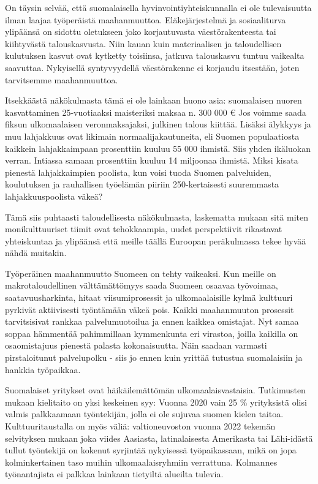 \documentclass[nobib,finnish,oneside,openany,notoc,a4paper]{tufte-book}
\begin{document}
On täysin selvää, että suomalaisella hyvinvointiyhteiskunnalla ei ole
tulevaisuutta ilman laajaa työperäistä maahanmuuttoa. Eläkejärjestelmä
ja sosiaaliturva ylipäänsä on sidottu oletukseen joko korjautuvasta
väestörakenteesta tai kiihtyvästä talouskasvusta. Niin kauan kuin
materiaalisen ja taloudellisen kulutuksen kasvut ovat kytketty
toisiinsa, jatkuva talouskasvu tuntuu vaikealta saavuttaa. Nykyisellä
syntyvyydellä väestörakenne ei korjaudu itsestään, joten tarvitsemme
maahanmuuttoa.

Itsekkäästä näkökulmasta tämä ei ole lainkaan huono asia: suomalaisen
nuoren kasvattaminen 25-vuotiaaksi maisteriksi maksaa n. 300 000 € Jos
voimme saada fiksun ulkomaalaisen veronmaksajaksi, julkinen talous kiittää. Lisäksi älykkyys ja muu
lahjakkuus ovat likimain normaalijakautuneita, eli Suomen populaatiosta
kaikkein lahjakkaimpaan prosenttiin kuuluu 55 000 ihmistä. Siis yhden
ikäluokan verran. Intiassa samaan prosenttiin kuuluu 14 miljoonaa
ihmistä. Miksi kisata pienestä lahjakkaimpien poolista, kun voisi tuoda
Suomen palveluiden, koulutuksen ja rauhallisen työelämän piiriin
250-kertaisesti suuremmasta lahjakkuuspoolista väkeä?

Tämä siis puhtaasti taloudellisesta näkökulmasta, laskematta mukaan sitä
miten monikulttuuriset tiimit ovat tehokkaampia, uudet perspektiivit
rikastavat yhteiskuntaa ja ylipäänsä että meille täällä Euroopan
peräkulmassa tekee hyvää nähdä muitakin.

Työperäinen maahanmuutto Suomeen on tehty vaikeaksi. Kun meille on
makrotaloudellinen välttämättömyys saada Suomeen osaavaa työvoimaa,
saatavuusharkinta, hitaat viisumiprosessit ja ulkomaalaisille kylmä
kulttuuri pyrkivät aktiivisesti työntämään väkeä pois. Kaikki
maahanmuuton prosessit tarvitsisivat rankkaa palvelumuotoilua ja ennen
kaikkea omistajat. Nyt samaa soppaa hämmentää pahimmillaan kymmenkunta
eri virastoa, joilla kaikilla on osaomistajuus pienestä palasta
kokonaisuutta. Näin saadaan varmasti pirstaloitunut palvelupolku - siis
jo ennen kuin yrittää tutustua suomalaisiin ja hankkia työpaikkaa.

Suomalaiset yritykset ovat häikäilemättömän ulkomaalaisvastaisia.
Tutkimusten mukaan kielitaito on yksi keskeinen syy: Vuonna 2020 vain 25
\% yrityksistä olisi valmis palkkaamaan työntekijän, jolla ei ole
sujuvaa suomen kielen taitoa. Kulttuuritaustalla on myös väliä:
valtioneuvoston vuonna 2022 tekemän selvityksen mukaan joka viides
Aasiasta, latinalaisesta Amerikasta tai Lähi-idästä tullut työntekijä on
kokenut syrjintää nykyisessä työpaikassaan, mikä on jopa kolminkertainen
taso muihin ulkomaalaisryhmiin verrattuna. Kolmannes työnantajista ei
palkkaa lainkaan tietyiltä alueilta tulevia.
\end{document}

